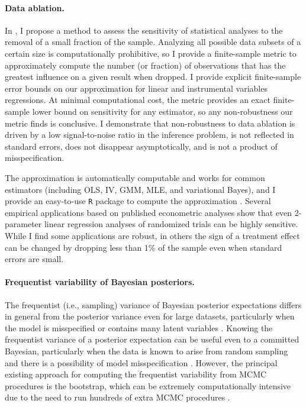 \paragraph{Data ablation.}

In \citet{giordano:2020:amip}, I propose a method to assess the sensitivity of
statistical analyses to the removal of a small fraction of the sample. Analyzing
all possible data subsets of a certain size is computationally prohibitive, so I
provide a finite-sample metric to approximately compute the number (or fraction)
of observations that has the greatest influence on a given result when dropped.
I provide explicit finite-sample error bounds on our approximation for linear
and instrumental variables regressions. At minimal computational cost, the
metric provides an exact finite-sample lower bound on sensitivity for any
estimator, so any non-robustness our metric finds is conclusive. I demonstrate
that non-robustness to data ablation is driven by a low signal-to-noise ratio in
the inference problem, is not reflected in standard errors, does not disappear
asymptotically, and is not a product of misspecification.

The approximation is automatically computable and works for common estimators
(including OLS, IV, GMM, MLE, and variational Bayes), and I provide an
easy-to-use \texttt{R} package to compute the approximation
\citep{zaminfluence}. Several empirical applications based on published
econometric analyses \citep{angelucci:2009:indirect, finkelstein:2012:oregon,
meager:2019:microcredit} show that even 2-parameter linear regression analyses
of randomized trials can be highly sensitive. While I find some applications are
robust, in others the sign of a treatment effect can be changed by dropping less
than 1\% of the sample even when standard errors are small.


\paragraph{Frequentist variability of Bayesian posteriors.}

The frequentist (i.e., sampling) variance of Bayesian posterior expectations
differs in general from the posterior variance even for large datasets,
particularly when the model is misspecified or contains many latent variables
\citep{kleijn:2006:misspecification}.
Knowing the frequentist variance of a posterior expectation can be useful even
to a committed Bayesian, particularly when the data is known to arise from
random sampling and there is a possibility of model misspecification
\citep{waddell:2002:bayesphyloboot}.  However, the
principal existing approach for computing the frequentist variability from MCMC
procedures is the bootstrap, which can be extremely computationally intensive
due to the need to run hundreds of extra MCMC procedures
\citep{huggins:2019:bayesbag}.

